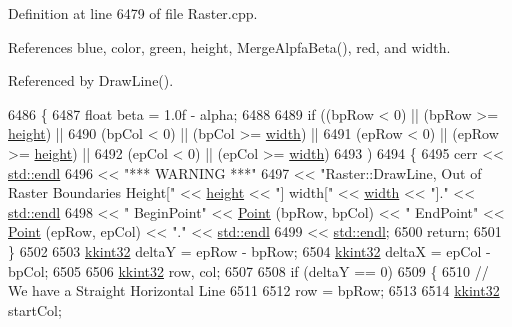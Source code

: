 Definition at line 6479 of file Raster.\+cpp.



References blue, color, green, height, Merge\+Alpfa\+Beta(), red, and width.



Referenced by Draw\+Line().


\begin{DoxyCode}
6486 \{
6487   \textcolor{keywordtype}{float}  beta = 1.0f - alpha;
6488 
6489   \textcolor{keywordflow}{if}  ((bpRow < 0)  ||  (bpRow >= \hyperlink{class_k_k_b_1_1_raster_af39ff189de4fbb6de98392e187efafb7}{height})  ||
6490        (bpCol < 0)  ||  (bpCol >= \hyperlink{class_k_k_b_1_1_raster_ae0bcc103e191c3421d7692dc69ceb554}{width})   ||
6491        (epRow < 0)  ||  (epRow >= \hyperlink{class_k_k_b_1_1_raster_af39ff189de4fbb6de98392e187efafb7}{height})  ||
6492        (epCol < 0)  ||  (epCol >= \hyperlink{class_k_k_b_1_1_raster_ae0bcc103e191c3421d7692dc69ceb554}{width})
6493       )
6494   \{
6495     cerr << \hyperlink{namespace_k_k_b_ad1f50f65af6adc8fa9e6f62d007818a8}{std::endl}
6496          << \textcolor{stringliteral}{"*** WARNING ***"}
6497          << \textcolor{stringliteral}{"Raster::DrawLine,  Out of Raster Boundaries   Height["} << \hyperlink{class_k_k_b_1_1_raster_af39ff189de4fbb6de98392e187efafb7}{height} << \textcolor{stringliteral}{"]  width["} << 
      \hyperlink{class_k_k_b_1_1_raster_ae0bcc103e191c3421d7692dc69ceb554}{width} << \textcolor{stringliteral}{"]."}  << \hyperlink{namespace_k_k_b_ad1f50f65af6adc8fa9e6f62d007818a8}{std::endl}
6498          << \textcolor{stringliteral}{"                   BeginPoint"} << \hyperlink{class_k_k_b_1_1_point}{Point} (bpRow, bpCol) << \textcolor{stringliteral}{"   EndPoint"} << 
      \hyperlink{class_k_k_b_1_1_point}{Point} (epRow, epCol) << \textcolor{stringliteral}{"."} << \hyperlink{namespace_k_k_b_ad1f50f65af6adc8fa9e6f62d007818a8}{std::endl}
6499          << \hyperlink{namespace_k_k_b_ad1f50f65af6adc8fa9e6f62d007818a8}{std::endl};
6500     \textcolor{keywordflow}{return};
6501   \}
6502 
6503   \hyperlink{namespace_k_k_b_a8fa4952cc84fda1de4bec1fbdd8d5b1b}{kkint32}  deltaY = epRow - bpRow;
6504   \hyperlink{namespace_k_k_b_a8fa4952cc84fda1de4bec1fbdd8d5b1b}{kkint32}  deltaX = epCol - bpCol;
6505 
6506   \hyperlink{namespace_k_k_b_a8fa4952cc84fda1de4bec1fbdd8d5b1b}{kkint32}  row, col;
6507 
6508   \textcolor{keywordflow}{if}  (deltaY == 0)
6509   \{
6510     \textcolor{comment}{// We have a Straight Horizontal Line}
6511 
6512     row = bpRow;
6513     
6514     \hyperlink{namespace_k_k_b_a8fa4952cc84fda1de4bec1fbdd8d5b1b}{kkint32}  startCol;

\end{DoxyCode}
